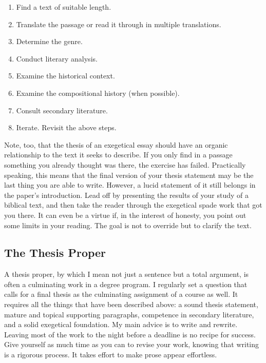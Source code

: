 \documentclass[11pt,twocolumn]{article}
\begin{document}
\begin{enumerate}

\item Find a text of suitable length.

\item Translate the passage or read it through in multiple translations.

\item Determine the genre.

\item Conduct literary analysis.

\item Examine the historical context.

\item Examine the compositional history (when possible).

\item Consult secondary literature.

\item Iterate. Revisit the above steps.

\end{enumerate}

Note, too, that the thesis of an exegetical essay should have an organic
relationship to the text it seeks to describe. If you only find in a
passage something you already thought was there, the exercise has
failed. Practically speaking, this means that the final version of your
thesis statement may be the last thing you are able to write. However, a
lucid statement of it still belongs in the paper's introduction. Lead
off by presenting the results of your study of a biblical text, and then
take the reader through the exegetical spade work that got you there. It
can even be a virtue if, in the interest of honesty, you point out some
limits in your reading. The goal is not to override but to clarify the
text.

\subsection{The Thesis Proper}

A thesis proper, by which I mean not just a sentence but a total
argument, is often a culminating work in a degree program. I regularly
set a question that calls for a final thesis as the culminating
assignment of a course as well. It requires all the things that have
been described above: a sound thesis statement, mature and topical
supporting paragraphs, competence in secondary literature, and a solid
exegetical foundation. My main advice is to write and rewrite. Leaving
most of the work to the night before a deadline is no recipe for
success. Give yourself as much time as you can to revise your work,
knowing that writing is a rigorous process. It takes effort to make
prose appear effortless.
\end{document}
